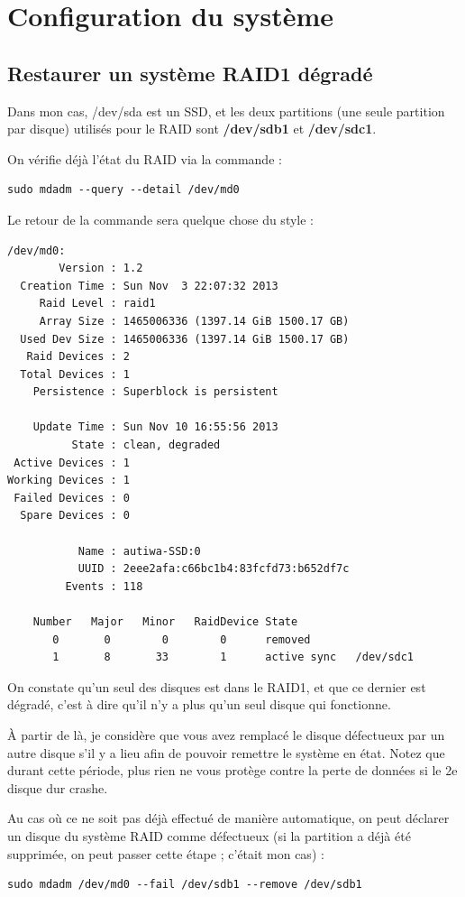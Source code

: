 \documentclass[a4paper,twoside]{article}
\begin{document}
\section{Configuration du système}
\subsection{Restaurer un système RAID1 \og dégradé\fg}
Dans mon cas, /dev/sda est un SSD, et les deux partitions (une seule partition par disque) utilisés pour le RAID sont 
\textbf{/dev/sdb1} et \textbf{/dev/sdc1}.

On vérifie déjà l'état du RAID via la commande : 
\begin{verbatim}
sudo mdadm --query --detail /dev/md0
\end{verbatim}

Le retour de la commande sera quelque chose du style : 
\begin{verbatim}
/dev/md0:
        Version : 1.2
  Creation Time : Sun Nov  3 22:07:32 2013
     Raid Level : raid1
     Array Size : 1465006336 (1397.14 GiB 1500.17 GB)
  Used Dev Size : 1465006336 (1397.14 GiB 1500.17 GB)
   Raid Devices : 2
  Total Devices : 1
    Persistence : Superblock is persistent

    Update Time : Sun Nov 10 16:55:56 2013
          State : clean, degraded 
 Active Devices : 1
Working Devices : 1
 Failed Devices : 0
  Spare Devices : 0

           Name : autiwa-SSD:0
           UUID : 2eee2afa:c66bc1b4:83fcfd73:b652df7c
         Events : 118

    Number   Major   Minor   RaidDevice State
       0       0        0        0      removed
       1       8       33        1      active sync   /dev/sdc1
\end{verbatim}

On constate qu'un seul des disques est dans le RAID1, et que ce dernier est dégradé, c'est à dire qu'il n'y a plus qu'un seul 
disque qui fonctionne. 

\begin{attention}
À partir de là, je considère que vous avez remplacé le disque défectueux par un autre disque s'il y a lieu afin de pouvoir 
remettre le 
système en état. Notez que durant cette période, plus rien ne vous protège contre la perte de données si le 2e disque dur 
crashe. 
\end{attention}

Au cas où ce ne soit pas déjà effectué de manière automatique, on peut déclarer un disque du système RAID comme défectueux (si 
la partition a déjà été supprimée, on peut passer cette étape ; c'était mon cas) : 
\begin{verbatim}
sudo mdadm /dev/md0 --fail /dev/sdb1 --remove /dev/sdb1
\end{verbatim}
\end{document}
